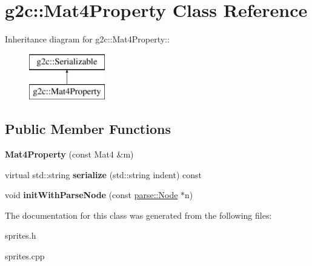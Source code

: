 \hypertarget{classg2c_1_1_mat4_property}{
\section{g2c::Mat4Property Class Reference}
\label{classg2c_1_1_mat4_property}
}
Inheritance diagram for g2c::Mat4Property::\begin{figure}[H]
\begin{center}
\leavevmode
\includegraphics[height=2cm]{classg2c_1_1_mat4_property}
\end{center}
\end{figure}
\subsection*{Public Member Functions}
\begin{DoxyCompactItemize}
\item 
\hypertarget{classg2c_1_1_mat4_property_a8ad71c6bde5b9e3859895cf64e147d42}{
{\bfseries Mat4Property} (const Mat4 \&m)}
\label{classg2c_1_1_mat4_property_a8ad71c6bde5b9e3859895cf64e147d42}

\item 
\hypertarget{classg2c_1_1_mat4_property_ae9b7ef379474f3bd0d19c147e071d069}{
virtual std::string {\bfseries serialize} (std::string indent) const }
\label{classg2c_1_1_mat4_property_ae9b7ef379474f3bd0d19c147e071d069}

\item 
\hypertarget{classg2c_1_1_mat4_property_a8e1515986b4345c1341a2b486fc6e688}{
void {\bfseries initWithParseNode} (const \hyperlink{classparse_1_1_node}{parse::Node} $\ast$n)}
\label{classg2c_1_1_mat4_property_a8e1515986b4345c1341a2b486fc6e688}

\end{DoxyCompactItemize}


The documentation for this class was generated from the following files:\begin{DoxyCompactItemize}
\item 
sprites.h\item 
sprites.cpp\end{DoxyCompactItemize}
